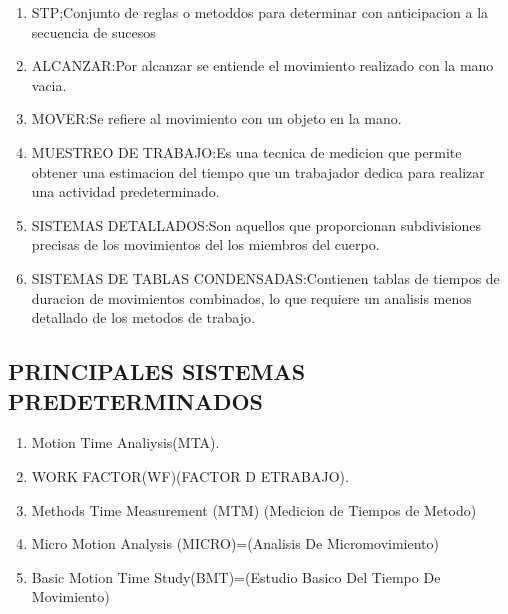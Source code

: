 \begin{enumerate}
    \item STP;Conjunto de reglas o metoddos para determinar con anticipacion a la secuencia de sucesos
    \item ALCANZAR:Por alcanzar se entiende el movimiento realizado con la mano vacia.
    \item MOVER:Se refiere al movimiento con un objeto en la mano.
    \item MUESTREO DE TRABAJO:Es una tecnica de medicion que permite obtener una estimacion del tiempo que un trabajador dedica para realizar una actividad predeterminado.
    \item SISTEMAS DETALLADOS:Son aquellos que proporcionan subdivisiones precisas de los movimientos del los miembros del cuerpo.
    \item SISTEMAS DE TABLAS CONDENSADAS:Contienen tablas de tiempos de duracion de movimientos combinados, lo que requiere un analisis menos detallado de los metodos de trabajo.
\end{enumerate}
\subsection{PRINCIPALES SISTEMAS PREDETERMINADOS}
\begin{enumerate}
    \item Motion Time Analiysis(MTA).
    \item WORK FACTOR(WF)(FACTOR D ETRABAJO).
    \item Methods Time Measurement (MTM) (Medicion de Tiempos de Metodo)
    \item Micro Motion Analysis (MICRO)=(Analisis De Micromovimiento)
    \item Basic Motion Time Study(BMT)=(Estudio Basico Del Tiempo De Movimiento)
\end{enumerate}


